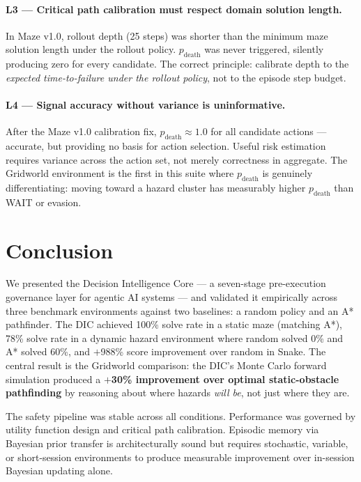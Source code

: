 \documentclass[11pt,letterpaper]{article}
\begin{document}
\paragraph{L3 --- Critical path calibration must respect domain solution length.}
In Maze v1.0, rollout depth (25 steps) was shorter than the minimum maze solution
length under the rollout policy. $p_{\mathrm{death}}$ was never triggered,
silently producing zero for every candidate. The correct principle: calibrate
depth to the \textit{expected time-to-failure under the rollout policy}, not to
the episode step budget.

\paragraph{L4 --- Signal accuracy without variance is uninformative.}
After the Maze v1.0 calibration fix, $p_{\mathrm{death}} \approx 1.0$ for all
candidate actions --- accurate, but providing no basis for action selection. Useful
risk estimation requires variance across the action set, not merely correctness in
aggregate. The Gridworld environment is the first in this suite where
$p_{\mathrm{death}}$ is genuinely differentiating: moving toward a hazard cluster
has measurably higher $p_{\mathrm{death}}$ than WAIT or evasion.

\section{Conclusion}
\label{sec:conclusion}

We presented the Decision Intelligence Core --- a seven-stage pre-execution
governance layer for agentic AI systems --- and validated it empirically across
three benchmark environments against two baselines: a random policy and an A*
pathfinder. The DIC achieved 100\% solve rate in a static maze (matching A*),
78\% solve rate in a dynamic hazard environment where random solved 0\% and A*
solved 60\%, and $+$988\% score improvement over random in Snake. The central
result is the Gridworld comparison: the DIC's Monte Carlo forward simulation
produced a \textbf{$+$30\% improvement over optimal static-obstacle pathfinding}
by reasoning about where hazards \textit{will be}, not just where they are.

The safety pipeline was stable across all conditions. Performance was governed by
utility function design and critical path calibration. Episodic memory via Bayesian
prior transfer is architecturally sound but requires stochastic, variable, or
short-session environments to produce measurable improvement over in-session
Bayesian updating alone.
\end{document}
